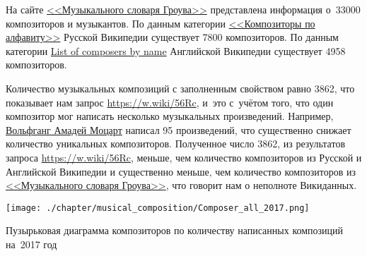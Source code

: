 На сайте  
\href{https://ru.wikipedia.org/?curid=1362802}
     {<<Музыкального словаря Гроува>>} 
представлена информация о~\num{33000} композиторов и музыкантов. 
По данным категории 
\href{https://ru.wikipedia.org/?curid=155531}
     {<<Композиторы по алфавиту>>} 
Русской Википедии существует \num{7800} композиторов. 
По данным категории 
\href{https://en.wikipedia.org/?curid=6921880}
     {List of composers by name} 
Английской Википедии существует \num{4958} композиторов.

Количество музыкальных композиций с заполненным свойством  равно \num{3862}, 
что показывает нам запрос \href{https://w.wiki/56Rc}{https://w.wiki/56Rc}, 
и~это с~учётом того, что один композитор мог написать несколько музыкальных произведений. 
Например, \href{https://ru.wikipedia.org/wiki/Моцарт,_Вольфганг_Амадей}{Вольфганг Амадей Моцарт} 
написал 95 произведений, что существенно снижает количество уникальных композиторов. 
Полученное число 3862, 
из результатов запроса \href{https://w.wiki/56Rc}{https://w.wiki/56Rc}, меньше, 
чем количество композиторов из Русской и Английской Википедии и существенно меньше, 
чем количество композиторов из \href{https://ru.wikipedia.org/wiki/Музыкальный_словарь_Гроува}{<<Музыкального словаря Гроува>>}, что говорит нам о неполноте Викиданных.




\begin{marginfigure}[-0\baselineskip]
  \texttt{[image: ./chapter/musical\_composition/Composer\_all\_2017.png]}
  \vspace{-7pt}
  \caption[Пузырьковая диаграмма композиторов по количеству написанных композиций на~2017 год]{Пузырьковая диаграмма композиторов по количеству написанных композиций на~2017 год}%
  \label{fig:Composers2017}%
\end{marginfigure}

